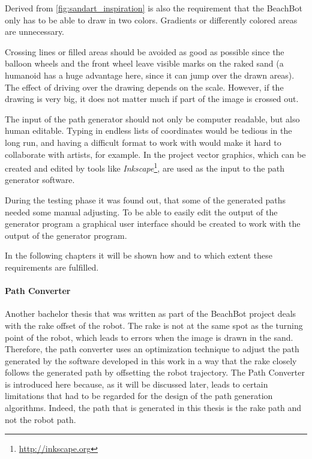 Derived from \autoref{fig:sandart_inspiration} is also the requirement that the BeachBot only has to be able to draw in two colors. Gradients or differently colored areas are unnecessary.

Crossing lines or filled areas should be avoided as good as possible since the balloon wheels and the front wheel leave visible marks on the raked sand (a humanoid has a huge advantage here, since it can jump over the drawn areas). The effect of driving over the drawing depends on the scale. However, if the drawing is very big, it does not matter much if part of the image is crossed out. 

The input of the path generator should not only be computer readable, but also human editable. Typing in endless lists of coordinates would be tedious in the long run, and having a difficult format to work with would make it hard to collaborate with artists, for example.  In the project vector graphics, which can be created and edited by tools like \textit{Inkscape}\footnote{\url{http://inkscape.org}}, are used as the input to the path generator software.

During the testing phase it was found out, that some of the generated paths needed some manual adjusting. To be able to easily edit the output of the generator program a graphical user interface should be created to work with the output of the generator program. 

In the following chapters it will be shown how and to which extent these requirements are fulfilled.

\paragraph{Path Converter}\label{sec:pathconv}

Another bachelor thesis that was written as part of the BeachBot project deals with the rake offset of the robot. The rake is not at the same spot as the turning point of the robot, which leads to errors when the image is drawn in the sand. Therefore, the path converter uses an optimization technique to adjust the path generated by the software developed in this work in a way that the rake closely follows the generated path by offsetting the robot trajectory. The Path Converter is introduced here because, as it will be discussed later, leads to certain limitations that had to be regarded for the design of the path generation algorithms. Indeed, the path that is generated in this thesis is the rake path and not the robot path.